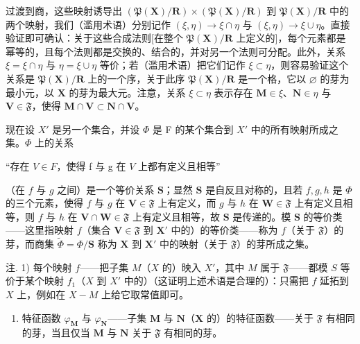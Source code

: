 过渡到商，这些映射诱导出 \((\mathfrak{P}(\mathbf{X}) / \mathbf{R}) \times (\mathfrak{P}(\mathbf{X}) / \mathbf{R})\) 到 \(\mathfrak{P}(\mathbf{X}) / \mathbf{R}\) 中的两个映射，我们（滥用术语）分别记作 \((\xi, \eta) \to \xi \cap \eta\) 与 \((\xi, \eta) \to \xi \cup \eta\)。直接验证即可确认：关于这些合成法则{[}在整个 \(\mathfrak{P}(\mathbf{X}) / \mathbf{R}\) 上定义的{]}，每个元素都是幂等的，且每个法则都是交换的、结合的，并对另一个法则可分配。此外，关系 \(\xi = \xi \cap \eta\) 与 \(\eta = \xi \cup \eta\) 等价；若（滥用术语）把它们记作 \(\xi \subset \eta\)，则容易验证这个关系是 \(\mathfrak{P}(\mathbf{X}) / \mathbf{R}\) 上的一个序，关于此序 \(\mathfrak{P}(\mathbf{X}) / \mathbf{R}\) 是一个格，它以 \(\varnothing\) 的芽为最小元，以 \(\mathbf{X}\) 的芽为最大元。注意，关系 \(\xi \subset \eta\) 表示存在 \(\mathbf{M} \in \xi\)、\(\mathbf{N} \in \eta\) 与 \(\mathbf{V} \in \mathfrak{F}\)，使得 \(\mathbf{M} \cap \mathbf{V} \subset \mathbf{N} \cap \mathbf{V}\)。

现在设 \(X'\) 是另一个集合，并设 \(\Phi\) 是 F 的某个集合到 \(X'\) 中的所有映射所成之集。\(\Phi\) 上的关系

“存在 \(V \in F\)，使得 f 与 g 在 \(V\) 上都有定义且相等”

（在 \(f\) 与 \(g\) 之间）是一个等价关系 \(\mathbf{S}\)；显然 \(\mathbf{S}\) 是自反且对称的，且若 \(f, g, h\) 是 \(\Phi\) 的三个元素，使得 \(f\) 与 \(g\) 在 \(\mathbf{V} \in \mathfrak{F}\) 上有定义，而 \(g\) 与 \(h\) 在 \(\mathbf{W} \in \mathfrak{F}\) 上有定义且相等，则 \(f\) 与 \(h\) 在 \(\mathbf{V} \cap \mathbf{W} \in \mathfrak{F}\) 上有定义且相等，故 \(\mathbf{S}\) 是传递的。模 \(\mathbf{S}\) 的等价类——这里指映射 \(f\)（集合 \(\mathbf{V} \in \mathfrak{F}\) 到 \(\mathbf{X}'\) 中的）的等价类——称为 \(f\)（关于 \(\mathfrak{F}\)）的芽，而商集 \(\tilde{\Phi} = \Phi / \mathbf{S}\) 称为 \(\mathbf{X}\) 到 \(\mathbf{X}'\) 中的映射（关于 \(\mathfrak{F}\)）的芽所成之集。

注. 1) 每个映射 \(f\)——把子集 \(M\)（\(X\) 的）映入 \(X'\)，其中 \(M\) 属于 \(\mathfrak{F}\)——都模 \(S\) 等价于某个映射 \(f_1\)（\(X\) 到 \(X'\) 中的）（这证明上述术语是合理的）：只需把 \(f\) 延拓到 \(X\) 上，例如在 \(X - M\) 上给它取常值即可。

\begin{enumerate}
\def\labelenumi{\arabic{enumi})}
\setcounter{enumi}{1}
\tightlist
\item
  特征函数 \(\varphi_{\mathbf{M}}\) 与 \(\varphi_{\mathbf{N}}\)——子集 \(\mathbf{M}\) 与 \(\mathbf{N}\)（\(\mathbf{X}\) 的）的特征函数——关于 \(\mathfrak{F}\) 有相同的芽，当且仅当 \(\mathbf{M}\) 与 \(\mathbf{N}\) 关于 \(\mathfrak{F}\) 有相同的芽。
\end{enumerate}

